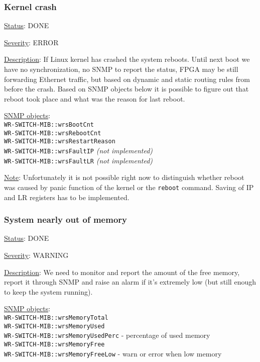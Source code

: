 \subsubsection{\bf Kernel crash}
		\begin{packed_enum}
			\item [] \underline{Status}: DONE
			\item [] \underline{Severity}: ERROR
			\item [] \underline{Description}:
				If Linux kernel has crashed the system reboots. Until next boot we have
				no synchronization, no SNMP to report the status, FPGA may be still
				forwarding Ethernet traffic, but based on dynamic and static routing
				rules from before the crash. Based on SNMP objects below it is possible
				to figure out that reboot took place and what was the reason for last reboot.
			\item [] \underline{SNMP objects}:\\
				\texttt{WR-SWITCH-MIB::wrsBootCnt}\\
				\texttt{WR-SWITCH-MIB::wrsRebootCnt}\\
				\texttt{WR-SWITCH-MIB::wrsRestartReason}\\
				\texttt{WR-SWITCH-MIB::wrsFaultIP} \emph{(not implemented)}\\
				\texttt{WR-SWITCH-MIB::wrsFaultLR} \emph{(not implemented)}
			\item [] \underline{Note}:
				Unfortunately it is not possible right now to distinguish whether reboot was caused by
				panic function of the kernel or the \texttt{reboot} command.
				Saving of IP and LR registers has to be implemented.
		\end{packed_enum}
\subsubsection{\bf System nearly out of memory}
		\label{fail:other:no_mem}
		\begin{packed_enum}
			\item [] \underline{Status}: DONE
			\item [] \underline{Severity}: WARNING
			\item [] \underline{Description}:
				We need to monitor and report the amount of the
				free memory, report it through SNMP and raise an alarm if it's extremely
				low (but still enough to keep the system running).
			\item [] \underline{SNMP objects}:\\
				\texttt{WR-SWITCH-MIB::wrsMemoryTotal}\\
				\texttt{WR-SWITCH-MIB::wrsMemoryUsed}\\
				\texttt{WR-SWITCH-MIB::wrsMemoryUsedPerc} - percentage of used memory\\
				\texttt{WR-SWITCH-MIB::wrsMemoryFree}\\
				\texttt{WR-SWITCH-MIB::wrsMemoryFreeLow} - warn or error when low memory
		\end{packed_enum}
